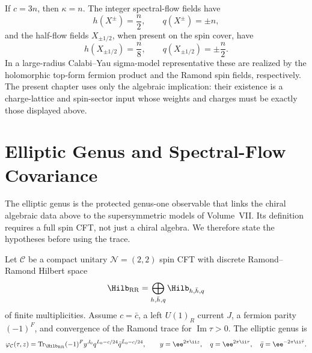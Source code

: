 \begin{example}
\label{ex:calabi-yau-type-spectral-flow-operators}
If \(c=3n\), then \(\kappa=n\).  The integer spectral-flow fields have
\[
  h(X^\pm)=\frac n2,
  \qquad
  q(X^\pm)=\pm n,
\]
and the half-flow fields \(X_{\pm1/2}\), when present on the spin cover,
have
\begin{equation}
  h(X_{\pm1/2})=\frac n8,
  \qquad
  q(X_{\pm1/2})=\pm\frac n2 .
  \label{eq:calabi-yau-type-half-flow-hq}
\end{equation}
In a large-radius Calabi--Yau sigma-model representative these are realized
by the holomorphic top-form fermion product and the Ramond spin fields,
respectively.  The present chapter uses only the algebraic implication:
their existence is a charge-lattice and spin-sector input whose weights and
charges must be exactly those displayed above.
\end{example}

\section{Elliptic Genus and Spectral-Flow Covariance}
\label{sec:elliptic-genus-spectral-flow-covariance}

The elliptic genus is the protected genus-one observable that links the
chiral algebraic data above to the supersymmetric models of Volume~VII.  Its
definition requires a full spin CFT, not just a chiral algebra.  We therefore
state the hypotheses before using the trace.

\begin{definition}
\label{def:elliptic-genus-setup}
Let \(\mathcal C\) be a compact unitary \(\mathcal N=(2,2)\) spin CFT with
discrete Ramond--Ramond Hilbert space
\[
  \Hilb_{\mathrm{RR}}
  =
  \bigoplus_{h,\bar h,q} \Hilb_{h,\bar h,q}
\]
of finite multiplicities.  Assume \(c=\bar c\), a left \(U(1)_R\) current
\(J\), a fermion parity \((-1)^F\), and convergence of the Ramond trace for
\(\operatorname{Im}\tau>0\).  The elliptic genus is
\begin{equation}
  \varphi_{\mathcal C}(\tau,z)
  =
  \operatorname{Tr}_{\Hilb_{\mathrm{RR}}}
  (-1)^F y^{J_0}
  q^{L_0-c/24}\bar q^{\bar L_0-c/24},
  \qquad
  y=\ee^{2\pi\ii z},\quad q=\ee^{2\pi\ii\tau},\quad
  \bar q=\ee^{-2\pi\ii\bar\tau}.
  \label{eq:elliptic-genus-definition}
\end{equation}
\end{definition}

